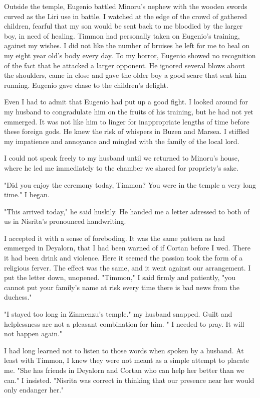 \documentclass{article}
\begin{document}
Outside the temple, Eugenio battled Minoru's  nephew with the wooden swords curved as the Liri use in battle. I watched at the edge of the crowd of gathered children, fearful that my son would be sent back to me bloodied by the larger boy, in need of healing. Timmon had personally taken on Eugenio's training, against my wishes. I did not like the number of bruises he left for me to heal on my eight year old's body every day. To my horror, Eugenio showed no recognition of the fact that he attacked a larger opponent. He ignored several blows about the shoulders, came in close and gave the older boy a good scare that sent him running. Eugenio gave chase to the children's delight.

Even I had to admit that Eugenio had put up a good fight. I looked around for my husband to congradulate him on the fruits of his training, but he had not yet emmerged. It was not like him to linger for inappropriate lengths of time before these foreign gods. He knew the risk of whispers in Buzen and Marsea. I stiffled my impatience and annoyance and mingled with the family of the local lord. 

I could not speak freely to my husband until we returned to Minoru's house, where he led me immediately to the chamber we shared for propriety's sake.

"Did you enjoy the ceremony today, Timmon? You were in the temple a very long time." I began.

"This arrived today," he said huskily. He handed me a letter adressed to both of us in Nisrita's pronounced handwriting.

I accepted it with a sense of foreboding. It was the same pattern as had emmerged in Deyalorn, that I had been warned of if Cortan before I wed. There it had been drink and violence. Here it seemed the passion took the form of a religious ferver. The effect was the same, and it went against our arrangement. I put the letter down, unopened. "Timmon," I said firmly and patiently, "you cannot put your family's name at risk every time there is bad news from the duchess." 

"I stayed too long in Zinmenzu's temple." my husband snapped. Guilt and helplessness are not a pleasant combination for him. " I needed to pray. It will not happen again."

I had long learned not to listen to those words when spoken by a husband. At least with Timmon, I knew they were not meant as a simple attempt to placate me. "She has friends in Deyalorn and Cortan who can help her better than we can." I insisted. "Nisrita was correct in thinking that our presence near her would only endanger her." 
\end{document}
